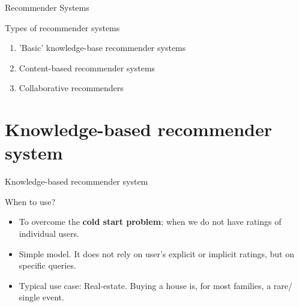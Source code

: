 \documentclass[compress]{beamer}
\begin{document}
\begin{frame}{Recommender Systems} 
	\begin{block}{Types of recommender systems  \parencite{Wieland2021, Locherbach2018, Moller2018}}
\begin{enumerate}
	\item 'Basic' knowledge-base recommender systems
	\item Content-based recommender systems
	\item Collaborative  recommenders 
\end{enumerate}
	\end{block}{\tiny }
\end{frame}

\section{Knowledge-based recommender system}
\begin{frame}{Knowledge-based recommender system} 
	\begin{block}{When to use?}
		\begin{itemize}
			\item<2-> To overcome the \textbf{cold start problem}; when we do not have ratings of individual users. 
			\item<3-> Simple model. It does not rely on user's explicit or implicit ratings, but on specific queries.
			\item<4-> Typical use case: Real-estate. Buying a house is, for most families, a rare/ single event. 
		\end{itemize}
	\end{block}
\end{frame}



\begin{frame}
\end{frame}
\end{document}
